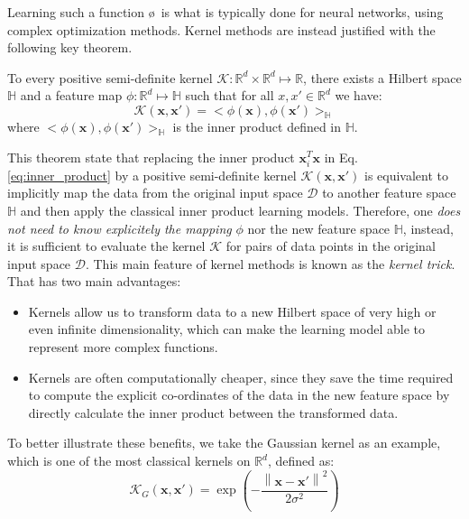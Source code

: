 Learning such a function \o~is what is typically done for neural networks, using complex optimization methods. Kernel methods are instead justified with the following key theorem.
\begin{theorem}
To every positive semi-definite kernel $\mathcal{K}:\mathbb{R}^d\times \mathbb{R}^d\mapsto \mathbb{R}$, there exists a Hilbert space $\mathbb{H}$ and a feature map $\phi:\mathbb{R}^d\mapsto\mathbb{H}$ such that for all $x,x'\in\mathbb{R}^d$ we have: 
\begin{equation}
\label{eq:kernel_main_equation}
    \mathcal{K}(\mathbf{x},\mathbf{x}')=<\phi(\mathbf{x}),\phi(\mathbf{x}')>_\mathbb{H}
\end{equation}
where $<\phi(\mathbf{x}),\phi(\mathbf{x}')>_\mathbb{H}$ is the inner product defined in $\mathbb{H}$.
\end{theorem}
This theorem state that replacing the inner product $\mathbf{x}_i^T\mathbf{x}$ in Eq. \ref{eq:inner_product} by a positive semi-definite kernel $\mathcal{K}(\mathbf{x},\mathbf{x}')$ is equivalent to implicitly map the data from the original input space $\mathcal{D}$ to another feature space $\mathbb{H}$ and then apply the classical inner product learning models. Therefore, one \emph{does not need to know explicitely the mapping} $\phi$ nor the new feature space $\mathbb{H}$, instead, it is sufficient to evaluate the kernel $\mathcal{K}$ for pairs of data points in the original input space $\mathcal{D}$. This main feature of kernel methods is known as the \emph{kernel trick}. That has two main advantages:
\begin{itemize}
    \item Kernels allow us to transform data to a new Hilbert space of very high or even infinite dimensionality, which can make the learning model able to represent more complex functions.
    \item Kernels are often computationally cheaper, since they save the time required to compute the explicit co-ordinates of the data in the new feature space by directly calculate the inner product between the transformed data.
\end{itemize}
To better illustrate these benefits, we take the Gaussian kernel as an example, which is one of the most classical kernels on $\mathbb{R}^d$, defined as:
\begin{equation}
\label{eq:Guassian_kernel}
    \mathcal{K}_{G}(\mathbf{x},\mathbf{x}')=\exp(-\frac{\left \| \mathbf{x}-\mathbf{x}'\right\|^2}{2\sigma^2})
\end{equation}

